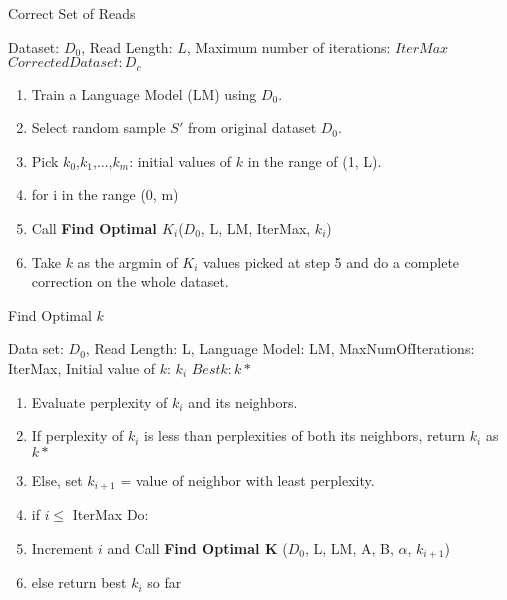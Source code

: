 \begin{minipage}[t]{.4\textwidth}
\begin{algorithm}[H]
\caption{Correct Set of Reads}
\begin{algorithmic} 
\REQUIRE Dataset: $D_{0}$, Read Length: $L$, Maximum number of iterations: $IterMax$
\ENSURE $Corrected Dataset: D_c$
\begin{enumerate}
\itemsep0em
\item Train a Language Model (LM) using $D_{0}$.
\item Select random sample $S'$ from original dataset $D_{0}$.
\item Pick $k_0$,$k_1$,...,$k_m$: initial values of $k$ in the range of (1, L).
\item for i in the range (0, m) 
\item \quad Call \textbf{Find Optimal $K_i$}($D_{0}$, L, LM, IterMax, $k_i$)
\item Take $k$ as the argmin of $K_i$ values picked at step 5 and do a complete correction on the whole dataset.
\end{enumerate}
\end{algorithmic}
\end{algorithm}
\end{minipage}
\hfill\vline\hfill
\begin{minipage}[t]{.4\textwidth}
\begin{algorithm} [H]
\caption{Find Optimal $k$}
\begin{algorithmic} 
\REQUIRE Data set: $D_{0}$, Read Length: L, Language Model: LM, MaxNumOfIterations: IterMax, Initial value of $k$: $k_i$ 
\ENSURE $Best k: k*$
\begin{enumerate}
\itemsep0em
\item %
Evaluate perplexity of $k_i$ and its neighbors.
\item If perplexity of $k_i$ is less than perplexities of both its neighbors, return $k_i$ as $k*$
\item Else, set $k_{i+1}$ = value of neighbor with least perplexity.
\item if $i \leq$ IterMax Do:
\item \quad Increment $i$ and Call \textbf{Find Optimal K} ($D_{0}$, L, LM, A, B, $\alpha$, $k_{i+1}$)
\item else  \quad return best $k_i$ so far
\end{enumerate}%
\end{algorithmic}
\end{algorithm}

\end{minipage}

